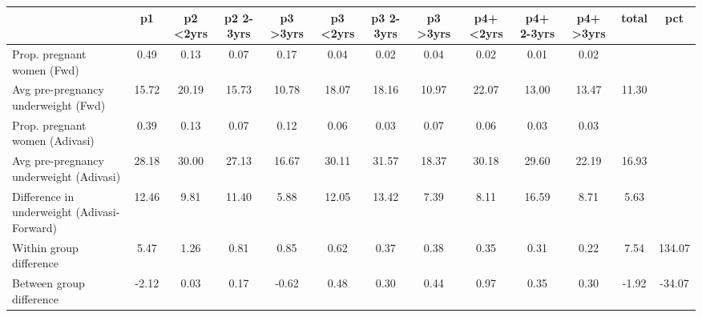 \begin{tabular}{l*{12}{c}}
\toprule
            &\multicolumn{1}{c}{p1}&\multicolumn{1}{c}{p2 <2yrs}&\multicolumn{1}{c}{p2 2-3yrs}&\multicolumn{1}{c}{p3 >3yrs}&\multicolumn{1}{c}{p3 <2yrs}&\multicolumn{1}{c}{p3 2-3yrs}&\multicolumn{1}{c}{p3 >3yrs}&\multicolumn{1}{c}{p4+ <2yrs}&\multicolumn{1}{c}{p4+ 2-3yrs}&\multicolumn{1}{c}{p4+ >3yrs}&\multicolumn{1}{c}{total}&\multicolumn{1}{c}{pct}\\
\midrule
\midrule
Prop. pregnant women (Fwd)&        0.49&        0.13&        0.07&        0.17&        0.04&        0.02&        0.04&        0.02&        0.01&        0.02&            &            \\
Avg pre-pregnancy underweight (Fwd)&       15.72&       20.19&       15.73&       10.78&       18.07&       18.16&       10.97&       22.07&       13.00&       13.47&       11.30&            \\
Prop. pregnant women (Adivasi)&        0.39&        0.13&        0.07&        0.12&        0.06&        0.03&        0.07&        0.06&        0.03&        0.03&            &            \\
Avg pre-pregnancy underweight (Adivasi)&       28.18&       30.00&       27.13&       16.67&       30.11&       31.57&       18.37&       30.18&       29.60&       22.19&       16.93&            \\
Difference in underweight (Adivasi-Forward)&       12.46&        9.81&       11.40&        5.88&       12.05&       13.42&        7.39&        8.11&       16.59&        8.71&        5.63&            \\
Within group difference&        5.47&        1.26&        0.81&        0.85&        0.62&        0.37&        0.38&        0.35&        0.31&        0.22&        7.54&      134.07\\
Between group difference&       -2.12&        0.03&        0.17&       -0.62&        0.48&        0.30&        0.44&        0.97&        0.35&        0.30&       -1.92&      -34.07\\
\bottomrule
\end{tabular}
